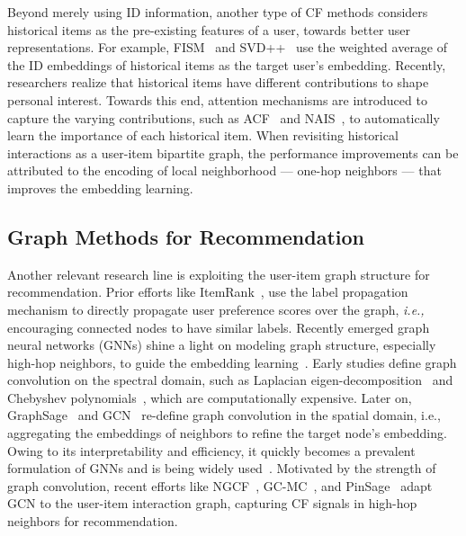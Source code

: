 \documentclass[sigconf]{acmart}
\newcommand{\ie}{\emph{i.e., }}
\theoremstyle{definition}
\begin{document}
Beyond merely using ID information, another type of CF methods considers historical items as the pre-existing features of a user, towards better user representations.
For example,  FISM~\cite{FISM} and SVD++~\cite{SVD++} use the weighted average of the ID embeddings of historical items as the target user's embedding. 
Recently, researchers realize that historical items have different contributions to shape personal interest.
Towards this end, attention mechanisms are introduced to capture the varying contributions, such as ACF~\cite{ACF} and NAIS~\cite{NAIS}, to automatically learn the importance of each historical item. 
When revisiting historical interactions as a user-item bipartite graph, the performance improvements can be attributed to the encoding of local neighborhood --- one-hop neighbors --- that improves the embedding learning.

\subsection{Graph Methods for Recommendation}
Another relevant research line is exploiting the user-item graph structure for recommendation.
Prior efforts like ItemRank~\cite{ItemRank}, use the label propagation mechanism to directly propagate user preference scores over the graph, \ie encouraging connected nodes to have similar labels.
Recently emerged graph neural networks (GNNs) shine a light on modeling graph structure, especially high-hop neighbors, to guide the embedding learning~\cite{GCN,GraphSAGE}.
Early studies define graph convolution on the spectral domain, such as Laplacian eigen-decomposition~\cite{DBLP:journals/corr/BrunaZSL13} and Chebyshev polynomials~\cite{FirstGCN}, which are computationally expensive.
Later on, GraphSage~\cite{GraphSAGE} and GCN~\cite{GCN} re-define graph convolution in the spatial domain, i.e., aggregating the embeddings of neighbors to refine the target node's embedding. Owing to its interpretability and efficiency, it quickly becomes a prevalent formulation of GNNs and is being widely used~\cite{DeepInf,Feng2019TOIS,zhao2019cross}.
Motivated by the strength of graph convolution, recent efforts like NGCF~\cite{NGCF}, GC-MC~\cite{GC-MC}, and PinSage~\cite{PinSage} adapt GCN to the user-item interaction graph, capturing CF signals in high-hop neighbors for recommendation.
\end{document}
